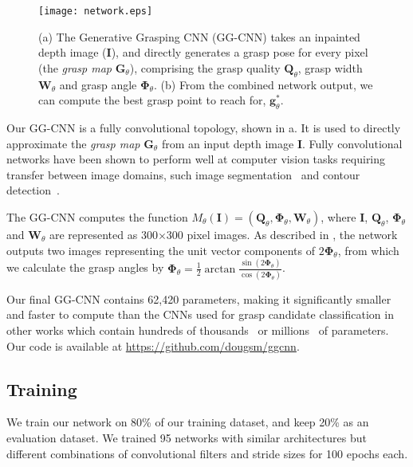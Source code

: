 \documentclass[conference]{IEEEtran}
\newcommand{\cG}{\mathbf{G}}
\newcommand{\cQ}{\mathbf{Q}}
\newcommand{\cW}{\mathbf{W}}
\newcommand{\fM}{M}
\newcommand{\bPhi}{\mathbf{\Phi}}
\newcommand{\bg}{\mathbf{g}}
\newcommand{\by}{\mathbf{I}}
\begin{document}
\begin{figure*}[t]
    \centering
    \texttt{[image: network.eps]}
    \vspace{-8mm}
    \caption{(a) The Generative Grasping CNN (GG-CNN) takes an inpainted depth image ($\by$), and directly generates a grasp pose for every pixel (the \textit{grasp map} $\cG_\theta$), comprising the grasp quality $\cQ_\theta$, grasp width $\cW_\theta$ and grasp angle $\bPhi_\theta$.  (b) From the combined network output, we can compute the best grasp point to reach for, $\bg^*_\theta$.
    }
  \label{fig:architecture} 
  \vspace{-4mm}
\end{figure*}

Our GG-CNN is a fully convolutional topology, shown in a. It is used to directly approximate the \textit{grasp map} $\cG_\theta$ from an input depth image $\by$.  Fully convolutional networks have been shown to perform well at computer vision tasks requiring transfer between image domains, such image segmentation~\cite{badrinarayanan2015segnet, long2015fully} and contour detection~\cite{yang2016object}.

The GG-CNN computes the function $\fM_\theta(\by) = (\cQ_\theta, \bPhi_\theta, \cW_\theta )$, where $\by$, $\cQ_\theta$, $\bPhi_\theta$ and $\cW_\theta$ are represented as 300$\times$300 pixel images.  As described in , the network outputs two images representing the unit vector components of $2\bPhi_\theta$, from which we calculate the grasp angles by $\bPhi_\theta = \frac{1}{2}\arctan\frac{\sin(2\bPhi_\theta)}{\cos(2\bPhi_\theta)}$.

Our final GG-CNN contains 62,420 parameters, making it significantly smaller and faster to compute than the CNNs used for grasp candidate classification in other works which contain hundreds of thousands~\cite{he2016deep, Levine2017LearningCollection} or millions~\cite{Johns2016DeepUncertainty, Mahler2017Dex2, Pinto2016SupersizingHours, Redmon2015Real-timeNetworks} of parameters.  Our code is available at \href{https://github.com/dougsm/ggcnn}{https://github.com/dougsm/ggcnn}.

\subsection{Training}

We train our network on 80\% of our training dataset, and keep 20\% as an evaluation dataset.  We trained 95 networks with similar architectures but different combinations of convolutional filters and stride sizes for 100 epochs each.  
\end{document}
